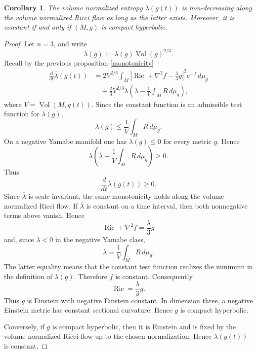 \documentclass{amsart}
\newtheorem{corollary}{Corollary}[section]
\begin{document}
\begin{corollary}
The volume normalized entropy $\overline{\lambda}(g(t))$ is non-decreasing along the volume normalized Ricci flow as long as the latter exists. Moreover, it is constant if and only if $(M,g)$ is compact hyperbolic.  
\end{corollary}
\begin{proof}
Let \(n=3\), and write
\[
        \overline{\lambda}(g)
        :=
        \lambda(g)\operatorname{Vol}(g)^{2/3}.
\]
Recall by the previous proposition \ref{monotonicity}
\[
\begin{aligned}
        \frac{d}{dt}\overline{\lambda}(g(t))
        &=
        2V^{2/3}
        \int_M
        \left|
        \operatorname{Ric}
        +
        \nabla^2 f
        -
        \frac{\lambda}{3}g
        \right|^2 e^{-f}\,d\mu_g        \\
        &\quad+
        \frac{2}{3}V^{2/3}\lambda
        \left(
        \lambda-\frac{1}{V}\int_M R\,d\mu_g
        \right),
\end{aligned}
\]
where \(V=\operatorname{Vol}(M,g(t))\). Since the constant function is an admissible test function for
\(\lambda(g)\),
\[
        \lambda(g)
        \leq
        \frac{1}{V}\int_M R\,d\mu_g .
\]
On a negative Yamabe manifold one has \(\lambda(g)\leq0\) for every metric
\(g\). Hence
\[
        \lambda
        \left(
        \lambda-\frac{1}{V}\int_M R\,d\mu_g
        \right)
        \geq0.
\]
Thus
\[
        \frac{d}{dt}\overline{\lambda}(g(t))\geq0.
\]
Since \(\overline{\lambda}\) is scale-invariant, the same monotonicity holds
along the volume-normalized Ricci flow. If \(\overline{\lambda}\) is constant on a time interval, then both
nonnegative terms above vanish. Hence
\[
        \operatorname{Ric}+\nabla^2 f
        =
        \frac{\lambda}{3}g
\]
and, since \(\lambda<0\) in the negative Yamabe class,
\[
        \lambda=
        \frac{1}{V}\int_M R\,d\mu_g .
\]
The latter equality means that the constant test function realizes the
minimum in the definition of \(\lambda(g)\). Therefore \(f\) is constant.
Consequently
\[
        \operatorname{Ric}
        =
        \frac{\lambda}{3}g .
\]
Thus \(g\) is Einstein with negative Einstein constant. In dimension three,
a negative Einstein metric has constant sectional curvature. Hence \(g\) is
compact hyperbolic.

\noindent Conversely, if \(g\) is compact hyperbolic, then it is Einstein and is fixed
by the volume-normalized Ricci flow up to the chosen normalization. Hence
\(\overline{\lambda}(g(t))\) is constant.
\end{proof}
\end{document}
